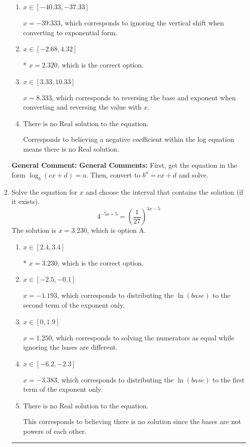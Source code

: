 \documentclass{extbook}[14pt]
\newcommand{\litem}[1]{\item #1

\rule{\textwidth}{0.4pt}}
\begin{document}
\begin{enumerate}
{\begin{enumerate}[label=\Alph*.]
$x = 13.000$, which corresponds to reversing the base and exponent when converting.
\item \( x \in [-40.33, -37.33] \)

$x = -39.333$, which corresponds to ignoring the vertical shift when converting to exponential form.
\item \( x \in [-2.68, 4.32] \)

* $x = 2.320$, which is the correct option.
\item \( x \in [3.33, 10.33] \)

$x = 8.333$, which corresponds to reversing the base and exponent when converting and reversing the value with $x$.
\item \( \text{There is no Real solution to the equation.} \)

Corresponds to believing a negative coefficient within the log equation means there is no Real solution.
\end{enumerate}

\textbf{General Comment:} \textbf{General Comments:} First, get the equation in the form $\log_b{(cx+d)} = a$. Then, convert to $b^a = cx+d$ and solve.
}
\litem{
Solve the equation for $x$ and choose the interval that contains the solution (if it exists).
\[ 4^{-5x+5} = \left(\frac{1}{27}\right)^{3x-5} \]The solution is \( x = 3.230 \), which is option A.\begin{enumerate}[label=\Alph*.]
\item \( x \in [2.4, 3.4] \)

* $x = 3.230$, which is the correct option.
\item \( x \in [-2.5, -0.1] \)

$x = -1.193$, which corresponds to distributing the $\ln(base)$ to the second term of the exponent only.
\item \( x \in [0, 1.9] \)

$x = 1.250$, which corresponds to solving the numerators as equal while ignoring the bases are different.
\item \( x \in [-6.2, -2.3] \)

$x = -3.383$, which corresponds to distributing the $\ln(base)$ to the first term of the exponent only.
\item \( \text{There is no Real solution to the equation.} \)

This corresponds to believing there is no solution since the bases are not powers of each other.
\end{enumerate}

}
\end{enumerate}
\end{document}
